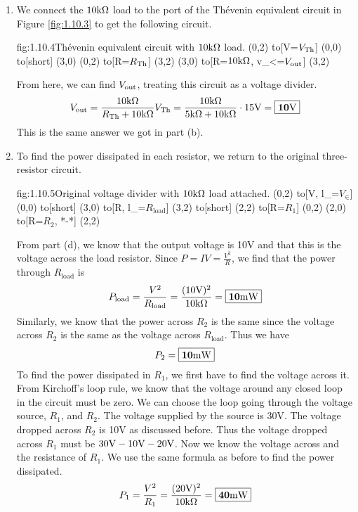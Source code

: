 \documentclass{article}
\begin{document}
\begin{enumerate}
        The Th\'evenin equivalent circuit takes the form shown below.
        \begin{circuit}{fig:1.10.3}{Th\'evenin equivalent circuit.}
            (0,2) to[V=$V_{\Th}$] (0,0)
            to[short, -o] (3,0)
            (0,2) to[R=$R_{\Th}$, -o] (3,2)
            (3,0) to[open, v_<=$V_\out$] (3,2)
        \end{circuit}
        In terms of behavior at the ports, this circuit is equivalent to the circuit in Figure \ref{fig:1.10.1}. 

        \item 
        We connect the $10\text{k}\Omega$ load to the port of the Th\'evenin equivalent circuit in Figure \ref{fig:1.10.3} to get the following circuit.
        \begin{circuit}{fig:1.10.4}{Th\'evenin equivalent circuit with $10\text{k}\Omega$ load.}
            (0,2) to[V=$V_{\Th}$] (0,0)
            to[short] (3,0)
            (0,2) to[R=$R_{\Th}$] (3,2)
            (3,0) to[R=$10\text{k}\Omega$, v_<=$V_\out$] (3,2)
        \end{circuit}
        From here, we can find $V_\out$, treating this circuit as a voltage divider.
        \[V_{\text{out}} = \frac{10\text{k}\Omega}{R_{\text{Th}} + 10\text{k}\Omega} V_{\text{Th}} = \frac{10\text{k}\Omega}{5\text{k}\Omega + 10\text{k}\Omega} \cdot 15\text{V} = \boxed{\mathbf{10\text{V}}}\] 
        This is the same answer we got in part (b).

        \item 
        To find the power dissipated in each resistor, we return to the original three-resistor circuit. 
        \begin{circuit}{fig:1.10.5}{Original voltage divider with $10\text{k}\Omega$ load attached.}
            (0,2) to[V, l_=$V_\in$] (0,0)
                to[short] (3,0)
                to[R, l_=$R_\text{load}$] (3,2)
                to[short] (2,2)
                to[R=$R_1$] (0,2)
            (2,0) to[R=$R_2$, *-*] (2,2)
        \end{circuit}

        From part (d), we know that the output voltage is 10V and that this is the voltage across the load resistor. Since $P = IV = \frac{V^2}{R}$, we find that the power through $R_\text{load}$ is 
        \[P_\text{load} = \frac{V^2}{R_\text{load}} = \frac{(10\text{V})^2}{10\text{k}\Omega} = \boxed{\mathbf{10\text{m}\text{W}}}\]
        Similarly, we know that the power across $R_2$ is the same since the voltage across $R_2$ is the same as the voltage across $R_\text{load}$. Thus we have
        \[P_2 = \boxed{\mathbf{10\text{m}\text{W}}}\]
        To find the power dissipated in $R_1$, we first have to find the voltage across it. From Kirchoff's loop rule, we know that the voltage around any closed loop in the circuit must be zero. We can choose the loop going through the voltage source, $R_1$, and $R_2$. The voltage supplied by the source is 30V. The voltage dropped across $R_2$ is 10V as discussed before. Thus the voltage dropped across $R_1$ must be $30\text{V} - 10\text{V} - 20\text{V}$. Now we know the voltage across and the resistance of $R_1$. We use the same formula as before to find the power dissipated.
        \[P_1 = \frac{V^2}{R_1} = \frac{(20\text{V})^2}{10\text{k}\Omega} = \boxed{\mathbf{40\text{m}\text{W}}}\]
    \end{enumerate}
\end{document}
